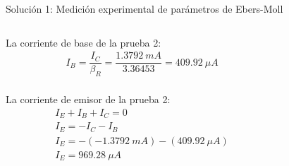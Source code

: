 \documentclass[t,aspectratio=169]{beamer}
\begin{document}
\begin{frame}{Solución 1: Medición experimental de parámetros de Ebers-Moll}

\begin{columns}
\begin{column}{0.5\textwidth}

La corriente de base de la prueba 2:
%
\begin{align*}
& I_B = \dfrac{I_C}{\beta_R} = \dfrac{1.3792\ mA}{3.36453} = 409.92\ \mu A \\
\end{align*}

La corriente de emisor de la prueba 2:
%
\begin{align*}
& I_E + I_B + I_C = 0 \\
& I_E = -I_C - I_B \\
& I_E = -(-1.3792\ mA) - (409.92\ \mu A) \\
& I_E = 969.28\ \mu A \\
\end{align*}

\end{column}
\begin{column}{0.5\textwidth}



\end{column}
\end{columns}

\end{frame}
\end{document}
